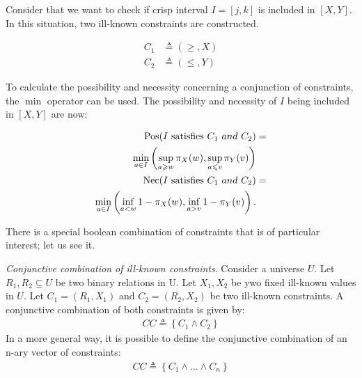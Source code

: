 \begin{example}
Consider that we want to check if crisp interval $I = \left[j, k\right]$ is included in $\left[X, Y\right]$. In this situation, two ill-known constraints are constructed.


\vspace{-10pt}

\begin{eqnarray}
C_1 & \triangleq\left(\geq,X\right)\\
C_2 & \triangleq\left(\leq,Y\right)
\end{eqnarray}

To calculate the possibility and necessity concerning a conjunction of constraints, the $\min$ operator can be used. The possibility and necessity of $I$ being included in $\left[X, Y\right]$ are now: %

\vspace{-10pt}

\begin{align}
\label{eq:interval-pos}
\operatorname{Pos}(I\text{ satisfies }C_1\ and\ C_2) & =\\
\nonumber
\min_{a \in I}\left(\sup_{a \geqslant w}\pi_{X}(w),\sup_{a \leqslant v}\pi_{Y}(v)\right)\\
\label{eq:interval-nec}
\operatorname{Nec}(I\text{ satisfies }C_1\ and\ C_2) & =\\
\nonumber
\min_{a \in I}\left(\inf_{a < w} 1-\pi_{X}(w),\inf_{a > v} 1-\pi_{Y}(v)\right).
\end{align}
\end{example}

There is a special boolean combination of constraints that is of particular interest; let us see it.
\begin{definition}
\emph{Conjunctive combination of ill-known constraints}. Consider a universe $U$. Let $R_1, R_2 \subseteq U$ be two binary relations in U. Let $X_1, X_2$ be ywo fixed ill-known values in $U$. Let  $C_1 = (R_1, X_1)$ and $C_2 = (R_2, X_2)$ be two ill-known constraints. A conjunctive combination of both constraints is given by:
\begin{align}
\label{eq:convex-combination}
CC \triangleq \left \lbrace C_1 \wedge C_2 \right \rbrace
\end{align}
In a more general way, it is possible to define the conjunctive combination of an n-ary vector of constraints:
\begin{align}
\label{eq:nary-convex-combination}
CC \triangleq \left \lbrace C_1 \wedge \ldots \wedge C_n \right \rbrace
\end{align}
\end{definition}


